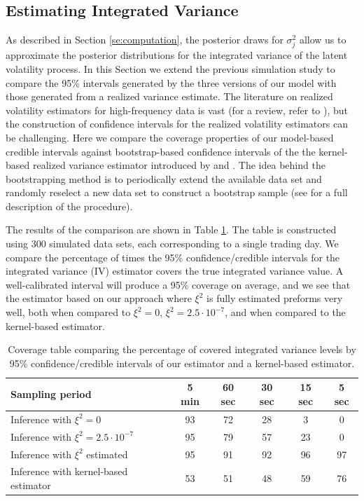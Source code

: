 \documentclass[10pt]{article}
\begin{document}
\subsection{Estimating Integrated Variance}

As described in Section \ref{se:computation}, the posterior draws for $\sigma^2_{j}$ allow us to approximate the posterior distributions for the integrated variance of the latent volatility process. In this Section we extend the previous simulation study to compare the 95\% intervals generated by the three versions of our model with those generated from a realized variance estimate.  The literature on realized volatility estimators for high-frequency data is vast (for a review, refer to \citealp{pigorsch2012volatility}), but the construction of confidence intervals for the realized volatility estimators can be challenging.  Here we compare the coverage properties of our model-based credible intervals against bootstrap-based confidence intervals of the the kernel-based realized variance estimator introduced by \cite{zhou1996high} and \cite{hansen2006realized}. The idea behind the bootstrapping method is to periodically extend the available data set and randomly reselect a new data set to construct a bootstrap sample (see \citealp{hwang2013stationary-bootstrap} for a full description of the procedure).

The results of the comparison are shown in Table \ref{ta:coverage}. The table is constructed using 300 simulated data sets, each corresponding to a single trading day. We compare the percentage of times the 95\% confidence/credible intervals for the integrated variance (IV) estimator covers the true integrated variance value.  A well-calibrated interval will produce a 95\% coverage on average, and we see that the estimator based on our approach where $\xi^2$ is fully estimated preforms very well, both when compared to $\xi^2 =0$, $\xi^2 = 2.5 \cdot 10^{-7}$, and when compared to the kernel-based estimator.

\begin{table}[h]
\begin{center}
\begin{tabular}{l|ccccc}
Sampling period   &   5 min  &	60 sec 	&   30 sec   &   15 sec & 5 sec  \\ \hline \hline
Inference with $\xi^2 = 0$  &  93  &  72  &   28  &	 3 & 0 \\
Inference with $\xi^2 = 2.5 \cdot 10^{-7}$ & 95 & 79 & 57 & 23 & 0 \\
Inference with $\xi^2$ estimated & 95 & 91 & 92 & 96 & 97  \\ \hline
Inference with kernel-based estimator &  53 & 51 & 48 & 59  & 76
\end{tabular}
\caption{Coverage table comparing the percentage of covered integrated variance levels by 95\% confidence/credible intervals of our estimator and a kernel-based estimator.}\label{ta:coverage}
\end{center}
\end{table}
\end{document}
